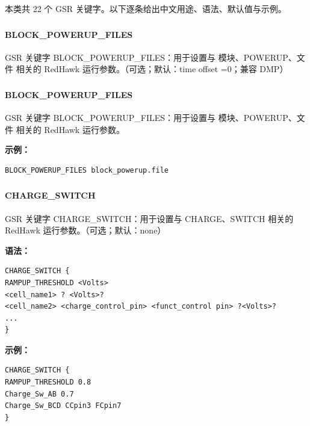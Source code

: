 本类共 22 个 GSR 关键字。以下逐条给出中文用途、语法、默认值与示例。

\subsubsection{}
\paragraph*{BLOCK_POWERUP_FILES}

GSR 关键字 BLOCK_POWERUP_FILES：用于设置与 模块、POWERUP、文件 相关的 RedHawk 运行参数。（可选；默认：time offset =0；兼容 DMP）

\subsubsection{}
\paragraph*{BLOCK_POWERUP_FILES}

GSR 关键字 BLOCK_POWERUP_FILES：用于设置与 模块、POWERUP、文件 相关的 RedHawk 运行参数。

\textbf{示例：}
\begin{lstlisting}
BLOCK_POWERUP_FILES block_powerup.file
\end{lstlisting}

\subsubsection{}
\paragraph*{CHARGE_SWITCH}

GSR 关键字 CHARGE_SWITCH：用于设置与 CHARGE、SWITCH 相关的 RedHawk 运行参数。（可选；默认：none）

\textbf{语法：}
\begin{lstlisting}
CHARGE_SWITCH {
RAMPUP_THRESHOLD <Volts>
<cell_name1> ? <Volts>?
<cell_name2> <charge_control_pin> <funct_control pin> ?<Volts>?
...
}
\end{lstlisting}

\textbf{示例：}
\begin{lstlisting}
CHARGE_SWITCH {
RAMPUP_THRESHOLD 0.8
Charge_Sw_AB 0.7
Charge_Sw_BCD CCpin3 FCpin7
}
\end{lstlisting}

